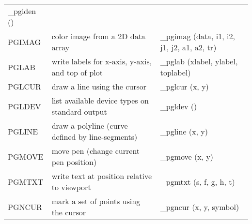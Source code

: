 \documentclass{book}
\begin{document}
\begin{center}
\begin{tabular}{|l|p{2.5in}|p{2.25in}|}
\_pgiden () \\
PGIMAG & color image from a 2D data array                                     &
\_pgimag (data, i1, i2, j1, j2, a1, a2, tr) \\
PGLAB & write labels for x-axis, y-axis, and top of plot                &
\_pglab (xlabel, ylabel, toplabel) \\
PGLCUR & draw a line using the cursor               &
\_pglcur (x, y) \\
PGLDEV & list available device types on standard output                 &
\_pgldev () \\
PGLINE & draw a polyline (curve defined by line-segments)               &
\_pgline (x, y) \\
PGMOVE & move pen (change current pen position)                         &
\_pgmove (x, y) \\
PGMTXT & write text at position relative to viewport                    &
\_pgmtxt (s, f, g, h, t) \\
PGNCUR & mark a set of points using the cursor               &
\_pgncur (x, y, symbol) \\
\hline
\end{tabular}


\end{center}
\end{document}
